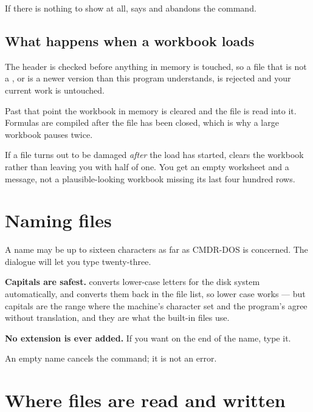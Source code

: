 If there is nothing to show at all, \ccprod{} says  and abandons the command.

\subsection{What happens when a workbook loads}

The header is checked before anything in memory is touched, so a file that is
not a , or is a newer version than this program understands, is
rejected and your current work is untouched.

Past that point the workbook in memory is cleared and the file is read into it.
Formulas are compiled after the file has been closed, which is why a large
workbook pauses twice.

\begin{ccnote}
If a file turns out to be damaged \emph{after} the load has started, \ccprod{}
clears the workbook rather than leaving you with half of one. You get an empty
worksheet and a message, not a plausible-looking workbook missing its last
four hundred rows.
\end{ccnote}

\section{Naming files}

\begin{ccsteps}
\item A name may be up to sixteen characters as far as CMDR-DOS is concerned.
The dialogue will let you type twenty-three.
\item \textbf{Capitals are safest.} \ccprod{} converts lower-case letters for
the disk system automatically, and converts them back in the file list, so
lower case works --- but capitals are the range where the machine's character
set and the program's agree without translation, and they are what the built-in
files use.
\item \textbf{No extension is ever added.} If you want  on the end
of the name, type it.
\item An empty name cancels the command; it is not an error.
\end{ccsteps}

\section{Where files are read and written}

